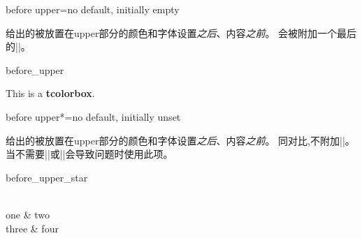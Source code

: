 \begin{docTcbKey}{before upper}{=}{no default, initially empty}

给出的被放置在upper部分的颜色和字体设置\emph{之后}、内容\emph{之前}。
会被附加一个最后的|\ignorespaces|。

\begin{exdispExample}{before_upper}

\begin{tcolorbox}[title=My title]
This is a \textbf{tcolorbox}.
\end{tcolorbox}
\end{exdispExample}
\end{docTcbKey}


\begin{docTcbKey}[][doc new=2019-02-26]{before upper*}{=}{no default, initially unset}

给出的被放置在upper部分的颜色和字体设置\emph{之后}、内容\emph{之前}。
同对比,不附加|\ignorespaces|。
当不需要|\ignorespaces|或|\ignorespaces|会导致问题时使用此项。

\begin{exdispExample}{before_upper_star}
\begin{tcolorbox}[size=small,tile,
  colback=yellow!20,colbacktitle=yellow!70!black,
  title=My table,hbox,center,center title,
  before upper*=\begin{tabular}{cc},
  after upper*=\end{tabular},
]
  \\
  one & two \\
  three & four\\
\end{tcolorbox}
\end{exdispExample}
\end{docTcbKey}

